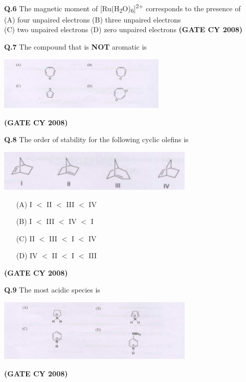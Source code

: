 \documentclass[12pt]{article}
\begin{document}
\begin{enumerate}
    \vspace{0.5cm}

    \textbf{Q.6} The magnetic moment of [Ru(H\textsubscript{2}O)\textsubscript{6}]\textsuperscript{2+} corresponds to the presence of\\
    (A) four unpaired electrons \quad
    (B) three unpaired electrons\\
    (C) two unpaired electrons \quad
    (D) zero unpaired electrons   \textbf{(GATE CY 2008)}


    \vspace{0.5cm}

\textbf{Q.7} \quad The compound that is \textbf{NOT} aromatic is

\begin{center}
  \includegraphics[width=0.6\textwidth]{figs/q7.png} 
\end{center}

\bigskip
   \textbf{(GATE CY 2008)}


\textbf{Q.8} The order of stability for the following cyclic olefins is

\begin{center}
  \includegraphics[width=0.7\textwidth]{figs/q8.png} 
\end{center}

\begin{itemize}
  \item[(A)] I \(<\) II \(<\) III \(<\) IV
  \item[(B)] I \(<\) III \(<\) IV \(<\) I
  \item[(C)] II \(<\) III \(<\) I \(<\) IV
  \item[(D)] IV \(<\) II \(<\) I \(<\) III
\end{itemize}   \textbf{(GATE CY 2008)}


\textbf{Q.9} The most acidic species is

\begin{center}
  \includegraphics[width=0.7\textwidth]{figs/q9.png} 
\end{center}   \textbf{(GATE CY 2008)}



\end{enumerate}
\end{document}
